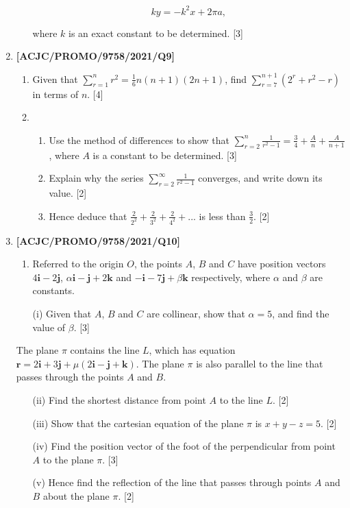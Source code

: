 \documentclass[twoside,english]{article}
\begin{document}
\begin{enumerate}
\begin{enumerate}
\[
ky=-k^{2}x+2\pi a,
\]
 

where $k$ is an exact constant to be determined. \hfill{}{[}3{]}
\end{enumerate}

 \newpage 

\item \textbf{{[}ACJC/PROMO/9758/2021/Q9{]}}
\begin{enumerate}
\item Given that $\sum\limits _{r=1}^{n}r^{2}=\frac{1}{6}n\left(n+1\right)\left(2n+1\right)$,
find $\sum\limits _{r=7}^{n+1}\left(2^{r}+r^{2}-r\right)$ in terms
of $n$. \hfill{}{[}4{]}
\item {}
\begin{enumerate}
\item Use the method of differences to show that $\sum\limits _{r=2}^{n}\frac{1}{r^{2}-1}=\frac{3}{4}+\frac{A}{n}+\frac{A}{n+1}$,
where $A$ is a constant to be determined. \hfill{}{[}3{]}
\item Explain why the series $\sum\limits _{r=2}^{\infty}\frac{1}{r^{2}-1}$
converges, and write down its value. \hfill{}{[}2{]}
\item Hence deduce that $\frac{2}{2^{2}}+\frac{2}{3^{2}}+\frac{2}{4^{2}}+...$
is less than $\frac{3}{2}$. \hfill{}{[}2{]}
\end{enumerate}
\end{enumerate}

 \newpage 

\item \textbf{{[}ACJC/PROMO/9758/2021/Q10{]}}
\begin{enumerate}
\item Referred to the origin $O$, the points $A$, $B$ and $C$ have position
vectors $4\mathbf{i}-2\mathbf{j}$, $\alpha\mathbf{i}-\mathbf{j}+2\mathbf{k}$
and $-\mathbf{i}-7\mathbf{j}+\beta\mathbf{k}$ respectively, where
$\alpha$ and $\beta$ are constants. 
\item[(i)]  Given that $A$, $B$ and $C$ are collinear, show that $\alpha=5$,
and find the value of $\beta$. \hfill{}{[}3{]}
\end{enumerate}
The plane $\pi$ contains the line $L$, which has equation $\mathbf{r}=2\mathbf{i}+3\mathbf{j}+\mu(2\mathbf{i}-\mathbf{j}+\mathbf{k}).$
The plane $\pi$ is also parallel to the line that passes through
the points $A$ and $B$. 
\begin{enumerate}
\item[(ii)]  Find the shortest distance from point $A$ to the line $L$. \hfill{}{[}2{]}
\item[(iii)]  Show that the cartesian equation of the plane $\pi$ is $x+y-z=5$.
\hfill{}{[}2{]}
\item[(iv)]  Find the position vector of the foot of the perpendicular from point
$A$ to the plane $\pi$. \hfill{}{[}3{]}
\item[(v)]  Hence find the reflection of the line that passes through points
$A$ and $B$ about the plane $\pi$. \hfill{}{[}2{]}
\end{enumerate}


\end{enumerate}
\end{document}
